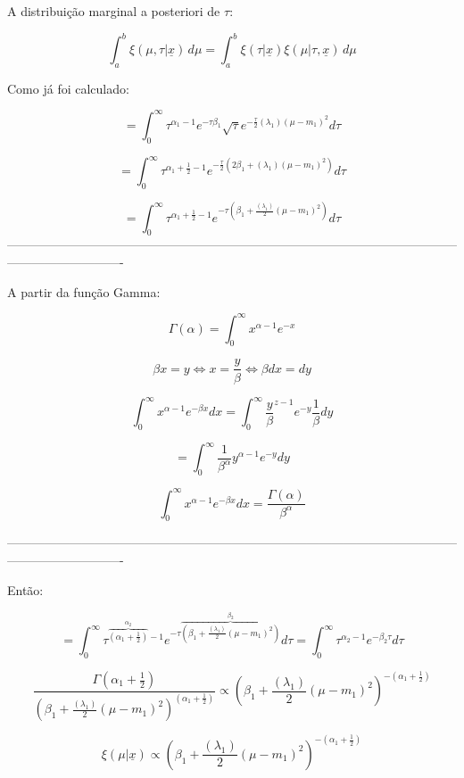 \documentclass{article}
\begin{document}
	A distribuição marginal a posteriori de $\tau$:
	
	$$ \int_{a}^{b} \xi(\mu, \tau | \underline{x}) \,d\mu = \int_{a}^{b} \xi(\tau | \underline{x}) \xi(\mu | \tau, \underline{x}) \,d\mu $$
	
	Como já foi calculado:
	
	$$= \int_{0}^{\infty} \tau^{\alpha_1 - 1} e^{-\tau \beta_1} \sqrt{\tau} e^{-\frac{\tau}{2}(\lambda_1)(\mu - m_1)^2} d\tau$$
	
	$$= \int_{0}^{\infty} \tau^{\alpha_1 + \frac{1}{2} - 1} e^{-\frac{\tau}{2}(2 \beta_1 + (\lambda_1)(\mu - m_1)^2)} d\tau$$ 
	
	$$= \int_{0}^{\infty} \tau^{\alpha_1 + \frac{1}{2} - 1} e^{-\tau(\beta_1 + \frac{(\lambda_1)}{2}(\mu - m_1)^2)} d\tau$$
	----------------------------------------------------------------------------------------------------------------------------------------
	
	A partir da função Gamma:
	
	$$\Gamma(\alpha) = \int_{0}^{\infty} x^{\alpha - 1} e^{-x}$$
	
	$$\beta x = y \Longleftrightarrow x = \frac{y}{\beta} \Longleftrightarrow \beta dx = dy$$
	
	$$\int_{0}^{\infty} x^{\alpha - 1} e^{-\beta x} dx = \int_{0}^{\infty} \frac{y}{\beta}^{z-1} e^{-y} \frac{1}{\beta} dy$$
	
	$$= \int_{0}^{\infty} \frac{1}{\beta^\alpha} y^{\alpha - 1} e^{-y} dy$$
	
	$$\int_{0}^{\infty} x^{\alpha - 1} e^{-\beta x} dx = \frac{\Gamma({\alpha})}{\beta^{\alpha}}$$
	
	----------------------------------------------------------------------------------------------------------------------------------------
	
	Então:
	
	$$= \int_{0}^{\infty} \tau^{\overbrace{(\alpha_1 + \frac{1}{2})}^{\alpha_2} - 1} e^{-\tau\overbrace{(\beta_1 + \frac{(\lambda_1)}{2}(\mu - m_1)^2)}^{\beta_2}} d\tau = \int_{0}^{\infty} \tau^{\alpha_2 - 1} e^{- \beta_2 \tau} d\tau$$
	
	
	$$\frac{\Gamma(\alpha_1 + \frac{1}{2})}{(\beta_1 + \frac{(\lambda_1)}{2}(\mu - m_1)^2)^{(\alpha_1 + \frac{1}{2})}} \propto (\beta_1 + \frac{(\lambda_1)}{2}(\mu - m_1)^2)^{-(\alpha_1 + \frac{1}{2})}$$
	
	
	$$\xi(\mu | \underline{x}) \propto (\beta_1 + \frac{(\lambda_1)}{2}(\mu - m_1)^2)^{-(\alpha_1 + \frac{1}{2})}$$
	
\end{document}
